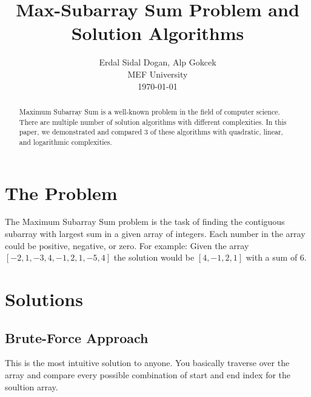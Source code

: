 \documentclass[twocolumns]{IEEEtran}
\author{Erdal Sidal Dogan, Alp Gokcek \\ MEF University \\ \today}
\title{Max-Subarray Sum Problem and Solution Algorithms}
\begin{document}
	\maketitle
	\begin{abstract}
		Maximum Subarray Sum is a well-known problem in the field of computer science. There are multiple number of solution algorithms with different complexities. In this paper, we demonstrated and compared 3 of these algorithms with quadratic, linear, and logarithmic complexities.
	\end{abstract}
\section{The Problem}
The Maximum Subarray Sum problem is the task of finding the contiguous subarray with largest sum in a given array of integers. Each number in the array could be positive, negative, or zero. For example: Given the array $[-2, 1, -3, 4, -1, 2, 1, -5, 4]$ the solution would be $[4, -1, 2, 1]$ with a sum of 6.
\section{Solutions}
\subsection{Brute-Force Approach}
This is the most intuitive solution to anyone. You basically traverse over the array and compare every possible combination of start and end index for the soultion array.\\ \\
\end{document}
